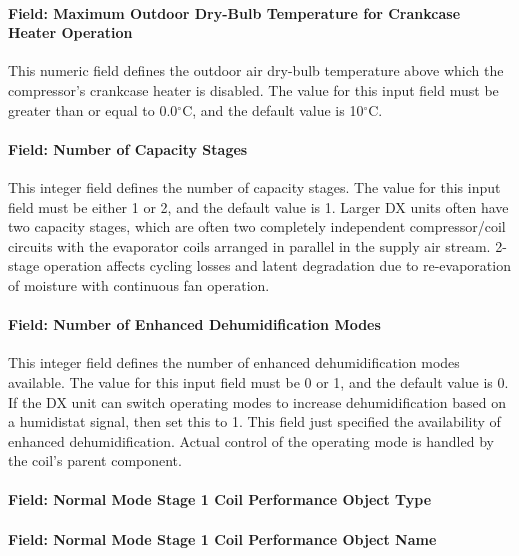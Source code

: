 \paragraph{Field: Maximum Outdoor Dry-Bulb Temperature for Crankcase Heater Operation}\label{field-maximum-outdoor-dry-bulb-temperature-for-crankcase-heater-operation-1}

This numeric field defines the outdoor air dry-bulb temperature above which the compressor's crankcase heater is disabled. The value for this input field must be greater than or equal to 0.0$^\circ$C, and the default value is 10$^\circ$C.

\paragraph{Field: Number of Capacity Stages}\label{field-number-of-capacity-stages}

This integer field defines the number of capacity stages. The value for this input field must be either 1 or 2, and the default value is 1. Larger DX units often have two capacity stages, which are often two completely independent compressor/coil circuits with the evaporator coils arranged in parallel in the supply air stream. 2-stage operation affects cycling losses and latent degradation due to re-evaporation of moisture with continuous fan operation.

\paragraph{Field: Number of Enhanced Dehumidification Modes}\label{field-number-of-enhanced-dehumidification-modes}

This integer field defines the number of enhanced dehumidification modes available. The value for this input field must be 0 or 1, and the default value is 0. If the DX unit can switch operating modes to increase dehumidification based on a humidistat signal, then set this to 1. This field just specified the availability of enhanced dehumidification. Actual control of the operating mode is handled by the coil's parent component.

\paragraph{Field: Normal Mode Stage 1 Coil Performance Object Type}\label{field-normal-mode-stage-1-coil-performance-object-type}

\paragraph{Field: Normal Mode Stage 1 Coil Performance Object Name}\label{field-normal-mode-stage-1-coil-performance-object-name}

